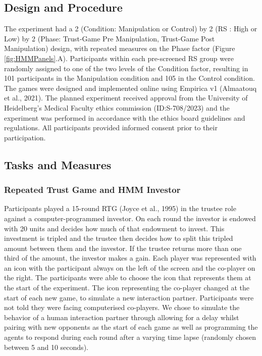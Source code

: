 \documentclass[
]{article}
\begin{document}
\subsection{Design and Procedure}\label{design-and-procedure}

The experiment had a 2 (Condition: Manipulation or Control) by 2 (RS :
High or Low) by 2 (Phase: Trust-Game Pre Manipulation, Trust-Game Post
Manipulation) design, with repeated measures on the Phase factor (Figure
\ref{fig:HMMPanels}.A). Participants within each pre-screened RS group
were randomly assigned to one of the two levels of the Condition factor,
resulting in 101 participants in the Manipulation condition and 105 in
the Control condition. The games were designed and implemented online
using Empirica v1 (Almaatouq et al., 2021). The planned experiment
received approval from the University of Heidelberg's Medical Faculty
ethics commission (ID:S-708/2023) and the experiment was performed in
accordance with the ethics board guidelines and regulations. All
participants provided informed consent prior to their participation.

\subsection{Tasks and Measures}\label{tasks-and-measures}

\subsubsection{Repeated Trust Game and HMM Investor}\label{repeated-trust-game-and-hmm-investor}

Participants played a 15-round RTG (Joyce et al., 1995) in the trustee
role against a computer-programmed investor. On each round the investor
is endowed with 20 units and decides how much of that endowment to
invest. This investment is tripled and the trustee then decides how to
split this tripled amount between them and the investor. If the trustee
returns more than one third of the amount, the investor makes a gain.
Each player was represented with an icon with the participant always on
the left of the screen and the co-player on the right. The participants
were able to choose the icon that represents them at the start of the
experiment. The icon representing the co-player changed at the start of
each new game, to simulate a new interaction partner. Participants were
not told they were facing computerised co-players. We chose to simulate
the behavior of a human interaction partner through allowing for a delay
whilst pairing with new opponents as the start of each game as well as
programming the agents to respond during each round after a varying time
lapse (randomly chosen between 5 and 10 seconds).
\end{document}
